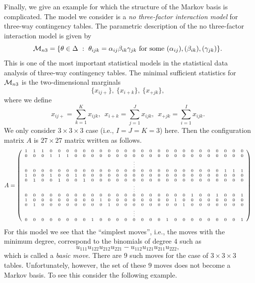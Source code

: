\documentclass[12pt]{article}
\theoremstyle{definition}
\def\Btheta{{\bf \theta}}
\begin{document}
Finally, we give an example for which the structure of the 
Markov basis is
complicated. 
The model we consider is a {\it no three-factor interaction model} for
three-way contingency tables. 
The parametric description of the no three-factor interaction model is
given by
\[
 {\cal M}_{n3} = \{\Btheta \in \Delta\ :\ \theta_{ijk} =
 \alpha_{ij}\beta_{ik}\gamma_{jk} \ \mbox{for some}\ (\alpha_{ij}),
 (\beta_{ik}), (\gamma_{jk})\}.
\]
This is one of the most important statistical models in the statistical
data analysis of three-way contingency tables. 
The minimal sufficient statistics for ${\cal M}_{n3}$ is the
two-dimensional marginals
\[
 \{x_{ij+}\},\ \{x_{i+k}\},\ \{x_{+jk}\},
\]
where we define
\[
 x_{ij+} = \sum_{k =1}^Kx_{ijk},\ \ 
 x_{i+k} = \sum_{j =1}^Jx_{ijk},\ \ 
 x_{+jk} = \sum_{i =1}^Ix_{ijk}.
\]
We only consider $3\times 3\times 3$ case (i.e., $I = J = K = 3$) here. 
Then the configuration matrix $A$ is $27\times 27$ matrix 
written as follows.
\[{\scriptsize
 A = \left(\begin{array}{ccccccccccccccccccccccccccc}
1 & 1 & 1 & 0 & 0 & 0 & 0 & 0 & 0 & 0 & 0 & 0 & 0 & 0 & 0 & 0 & 0 & 0 &
 0 & 0 & 0 & 0 & 0 & 0 & 0 & 0 & 0\\
0 & 0 & 0 & 1 & 1 & 1 & 0 & 0 & 0 & 0 & 0 & 0 & 0 & 0 & 0 & 0 & 0 & 0 &
 0 & 0 & 0 &
 0 & 0 & 0 & 0 & 0 & 0\\
\multicolumn{27}{c}{\vdots}\\
0 & 0 & 0 & 0 & 0 & 0 & 0 & 0 & 0 & 0 & 0 & 0 & 0 & 0 & 0 &
 0 & 0 & 0 &
 0 & 0 & 0 & 0 & 0 & 0 & 1 & 1 & 1\\
1 & 0 & 0 & 1 & 0 & 0 & 1 & 0 & 0 & 0 & 0 & 0 & 0 & 0 & 0 & 0 & 0 & 0 &
 0 & 0 & 0 &
 0 & 0 & 0 & 0 & 0 & 0\\
0 & 1 & 0 & 0 & 1 & 0 & 0 & 1 & 0 & 0 & 0 & 0 & 0 & 0 & 0 & 0 & 0 & 0 & 0 &
 0 & 0 & 0 &
 0 & 0 & 0 & 0 & 0\\
\multicolumn{27}{c}{\vdots}\\
0 & 0 & 0 & 0 & 0 & 0 & 0 & 0 & 0 & 0 & 0 & 0 & 0 & 0 & 0 & 0 & 0 & 0 & 0 &
 0 & 1 & 0 &
 0 & 1 & 0 & 0 & 1\\
1 & 0 & 0 & 0 & 0 & 0 & 0 & 0 & 0 & 
1 & 0 & 0 & 0 & 0 & 0 & 0 & 0 & 0 & 
1 & 0 & 0 & 0 & 0 & 0 & 0 & 0 & 0\\
0 & 1 & 0 & 0 & 0 & 0 & 0 & 0 & 0 & 0 & 
1 & 0 & 0 & 0 & 0 & 0 & 0 & 0 & 0 & 
1 & 0 & 0 & 0 & 0 & 0 & 0 & 0\\
\multicolumn{27}{c}{\vdots}\\
0 & 0 & 0 & 0 & 0 & 0 & 0 & 0 & 1 & 
0 & 0 & 0 & 0 & 0 & 0 & 0 & 0 & 1 & 
0 & 0 & 0 & 0 & 0 & 0 & 0 & 0 & 1
\end{array}
\right)
}\]
For this model we see that the ``simplest moves'', i.e., the moves with
the minimum degree, correspond to the binomials of degree $4$ such as
\begin{equation}
 u_{111}u_{122}u_{212}u_{221} - u_{112}u_{121}u_{211}u_{222},
\label{eqn:basic-move-3way}
\end{equation}
which is called a {\it basic move}. 
There are $9$ such moves for the case of $3\times 3\times 3$ tables. 
Unfortunately, however, the set of these $9$ moves does not become a
Markov basis. To see this consider the following example.
\end{document}
